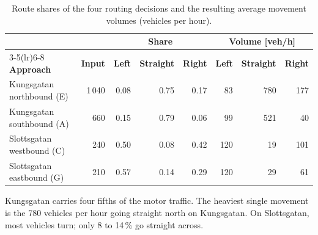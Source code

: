 \documentclass[11pt,a4paper]{article}
\begin{document}
\begin{table}[!htb]
\centering
\caption[Route shares and movement volumes]{Route shares of the four routing decisions and the
resulting average movement volumes (vehicles per hour).}
\label{tab:routes}
\small
\begin{tabular}{lrrrrrrr}
\toprule
& & \multicolumn{3}{c}{\textbf{Share}} & \multicolumn{3}{c}{\textbf{Volume [veh/h]}}\\
\cmidrule(lr){3-5}\cmidrule(lr){6-8}
\textbf{Approach} & \textbf{Input} & \textbf{Left} & \textbf{Straight} & \textbf{Right} & \textbf{Left} & \textbf{Straight} & \textbf{Right}\\
\midrule
Kungsgatan northbound (E) & 1\,040 & 0.08 & 0.75 & 0.17 & 83  & 780 & 177\\
Kungsgatan southbound (A) & 660    & 0.15 & 0.79 & 0.06 & 99  & 521 & 40\\
Slottsgatan westbound (C) & 240    & 0.50 & 0.08 & 0.42 & 120 & 19  & 101\\
Slottsgatan eastbound (G) & 210    & 0.57 & 0.14 & 0.29 & 120 & 29  & 61\\
\bottomrule
\end{tabular}
\end{table}

Kungsgatan carries four fifths of the motor traffic. The heaviest single movement is the 780
vehicles per hour going straight north on Kungsgatan. On Slottsgatan, most vehicles turn; only 8 to
14\,\% go straight across.
\end{document}
